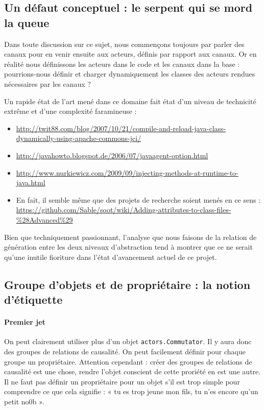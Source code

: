 \documentclass[11pt]{article}
\begin{document}
\subsection{Un défaut conceptuel : le serpent qui se mord la queue}

Dans toute discussion sur ce sujet, nous commençons toujours par parler des canaux pour en venir ensuite aux acteurs, définis par rapport aux canaux. Or en réalité nous définissons les acteurs dans le code et les canaux dans la base : pourrions-nous définir et charger dynamiquement les classes des acteurs rendues nécessaires par les canaux ?

Un rapide état de l'art mené dans ce domaine fait état d'un niveau de technicité extrême et d'une complexité faramineuse :
\begin{itemize}
\item \url{http://twit88.com/blog/2007/10/21/compile-and-reload-java-class-dynamically-using-apache-commons-jci/}
\item \url{http://javahowto.blogspot.de/2006/07/javaagent-option.html}
\item \url{http://www.nurkiewicz.com/2009/09/injecting-methods-at-runtime-to-java.html}
\item En fait, il semble même que des projets de recherche soient menés en ce sens : \url{https://github.com/Sable/soot/wiki/Adding-attributes-to-class-files-\%28Advanced\%29}
\end{itemize}
Bien que techniquement passionnant, l'analyse que nous faisons de la relation de génération entre les deux niveaux d'abstraction tend à montrer que ce ne serait qu'une inutile fioriture dans l'état d'avancement actuel de ce projet.

\subsection{Groupe d'objets et de propriétaire : la notion d'étiquette}

\paragraph{Premier jet} On peut clairement utiliser plus d'un objet \texttt{actors.Commutator}. Il y aura donc des groupes de relations de causalité. On peut facilement définir pour chaque groupe un propriétaire. Attention cependant : créer des groupes de relations de causalité est une chose, rendre l'objet conscient de cette proriété en est une autre. Il ne faut pas définir un propriétaire pour un objet s'il est trop simple pour comprendre ce que cela signifie : « tu es trop jeune mon fils, tu n'es encore qu'un petit no0b ».
\end{document}
